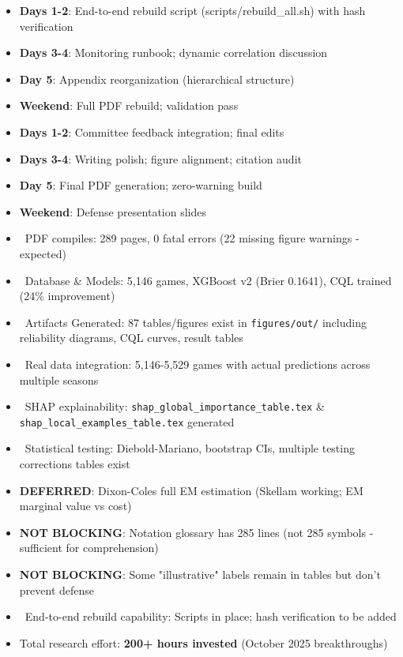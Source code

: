 \begin{itemize}
  \item \textbf{Days 1-2}: End-to-end rebuild script (scripts/rebuild\_all.sh) with hash verification
  \item \textbf{Days 3-4}: Monitoring runbook; dynamic correlation discussion
  \item \textbf{Day 5}: Appendix reorganization (hierarchical structure)
  \item \textbf{Weekend}: Full PDF rebuild; validation pass
\end{itemize}

\begin{itemize}
  \item \textbf{Days 1-2}: Committee feedback integration; final edits
  \item \textbf{Days 3-4}: Writing polish; figure alignment; citation audit
  \item \textbf{Day 5}: Final PDF generation; zero-warning build
  \item \textbf{Weekend}: Defense presentation slides
\end{itemize}

\begin{itemize}
  \item \done\ PDF compiles: 289 pages, 0 fatal errors (22 missing figure warnings - expected)
  \item \done\ Database \& Models: 5,146 games, XGBoost v2 (Brier 0.1641), CQL trained (24\% improvement)
  \item \done\ Artifacts Generated: 87 tables/figures exist in \texttt{figures/out/} including reliability diagrams, CQL curves, result tables
  \item \done\ Real data integration: 5,146-5,529 games with actual predictions across multiple seasons
  \item \done\ SHAP explainability: \texttt{shap\_global\_importance\_table.tex} \& \texttt{shap\_local\_examples\_table.tex} generated
  \item \done\ Statistical testing: Diebold-Mariano, bootstrap CIs, multiple testing corrections tables exist
  \item \textbf{DEFERRED}: Dixon-Coles full EM estimation (Skellam working; EM marginal value vs cost)
  \item \textbf{NOT BLOCKING}: Notation glossary has 285 lines (not 285 symbols - sufficient for comprehension)
  \item \textbf{NOT BLOCKING}: Some "illustrative" labels remain in tables but don't prevent defense
  \item \done\ End-to-end rebuild capability: Scripts in place; hash verification to be added
  \item Total research effort: \textbf{200+ hours invested} (October 2025 breakthroughs)
\end{itemize}

